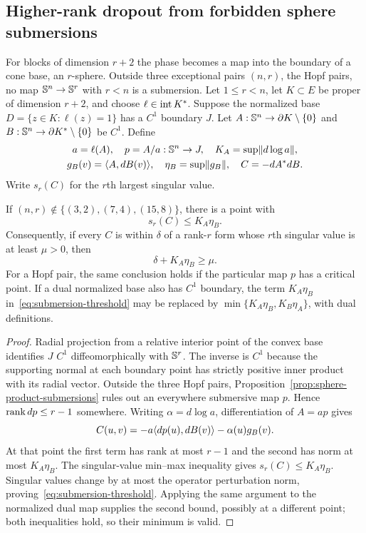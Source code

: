 \subsection{Higher-rank dropout from forbidden sphere submersions}
For blocks of dimension $r+2$ the phase becomes a map into the
boundary of a cone base, an $r$-sphere. Outside three exceptional pairs
$(n,r)$, the Hopf pairs, no map $\mathbb S^n\to\mathbb S^r$ with $r<n$ is a
submersion.
Let $1\leq r<n$, let $K\subset E$ be proper of dimension $r+2$,
and choose $\ell\in\operatorname{int} K^*$. Suppose the normalized base
$D=\{z\in K:\ell(z)=1\}$ has a $C^1$ boundary $J$.
Let $A:\mathbb S^n\to\partial K\setminus\{0\}$ and
$B:\mathbb S^n\to\partial K^*\setminus\{0\}$ be $C^1$. Define
\[
 \begin{gathered}
 a=\ell(A),\quad p=A/a:\mathbb S^n\to J,\quad
 K_A=\sup\lVert d\log a\rVert,\\
 g_B(v)=\langle A,dB(v)\rangle,\quad \eta_B=\sup\lVert g_B\rVert,
 \quad C=-dA^*dB.
 \end{gathered}
\]
Write $s_r(C)$ for the $r$th largest singular value.

\begin{theorem}
\label{thm:robust-submersion}
If $(n,r)\notin\{(3,2),(7,4),(15,8)\}$, there is a point with
\[
 s_r(C)\leq K_A\eta_B.
\]
Consequently, if every $C$ is within $\delta$ of a rank-$r$ form
whose $r$th singular value is at least $\mu>0$, then
\begin{equation}\label{eq:submersion-threshold}
 \delta+K_A\eta_B\geq\mu.
\end{equation}
For a Hopf pair, the same conclusion holds if the particular
map $p$ has a critical point. If a dual normalized base also has $C^1$
boundary, the term $K_A\eta_B$ in~\eqref{eq:submersion-threshold}
may be replaced by $\min\{K_A\eta_B,K_B\eta_A\}$, with dual definitions.
\end{theorem}
\begin{proof}
Radial projection from a relative interior point of the convex base
identifies $J$ $C^1$ diffeomorphically with $\mathbb S^r$. The inverse is
$C^1$ because the supporting normal at each boundary point has strictly
positive inner product with its radial vector. Outside the three Hopf
pairs, Proposition~\ref{prop:sphere-product-submersions} rules out an
everywhere submersive map $p$. Hence $\operatorname{rank} dp\leq r-1$ somewhere.
Writing $\alpha=d\log a$, differentiation of $A=ap$ gives
\[
 C(u,v)=-a\langle dp(u),dB(v)\rangle-\alpha(u)g_B(v).
\]
At that point the first term has rank at most $r-1$ and the second
has norm at most $K_A\eta_B$. The singular-value min--max inequality
gives $s_r(C)\leq K_A\eta_B$. Singular values change by at most the
operator perturbation norm, proving~\eqref{eq:submersion-threshold}.
Applying the same argument to the normalized dual map supplies the
second bound, possibly at a different point; both inequalities hold,
so their minimum is valid.
\end{proof}

